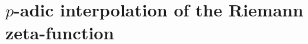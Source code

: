 \documentclass[../Koblitz.tex]{subfiles}
\begin{document}
\chapter{\texorpdfstring{$p$}{p}-adic interpolation of the Riemann zeta-function}

\subsection*{}
\end{document}
